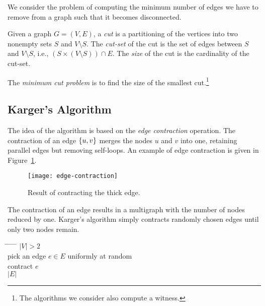 
We consider the problem of computing the minimum number of edges we have to
remove from a graph such that it becomes disconnected.

\begin{definition}[Cut]
  Given a graph $G=(V,E)$, a \emph{cut} is a partitioning of the vertices into
  two nonempty sets $S$ and $V \setminus S$.
  The \emph{cut-set} of the cut is the set of edges between $S$ and
  $V \setminus S$, i.e., $(S \times (V \setminus S)) \cap E$.
  The \emph{size} of the cut is the cardinality of the cut-set.
\end{definition}

The \emph{minimum cut problem} is to find the size of the smallest
cut.\footnote{The algorithms we consider also compute a witness.}

\subsection{Karger's Algorithm}

The idea of the algorithm is based on the \emph{edge contraction} operation.
The contraction of an edge $\{u,v\}$ merges the nodes $u$ and $v$ into one,
retaining parallel edges but removing self-loops.
An example of edge contraction is given in Figure~\ref{fig:edge-contraction}.

\begin{figure}[h]
  \centering
  \texttt{[image: edge-contraction]}
  \caption{Result of contracting the thick edge.}
  \label{fig:edge-contraction}
\end{figure}

The contraction of an edge results in a multigraph with the number of nodes
reduced by one.
Karger's algorithm simply contracts randomly chosen edges until only two nodes
remain.

\begin{tabbing}
\hspace*{.25in} \= \hspace*{.25in} \= \hspace*{.25in} \= \hspace*{.25in} \= \hspace*{.25in} \=\kill
{} $|V| > 2$ \\
\>\> pick an edge $e \in E$ uniformly at random \\
\>\> contract $e$ \\
 $|E|$
\end{tabbing}


